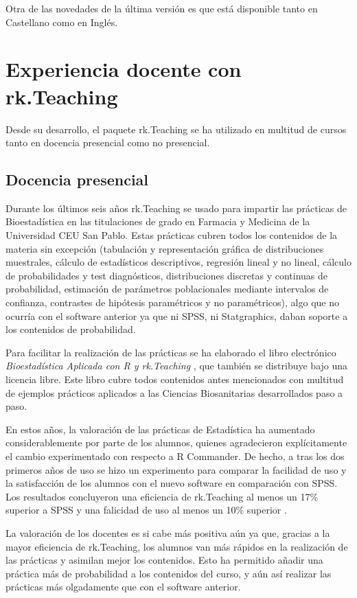\documentclass[a4paper,10pt,twoside]{article}
\newcommand{\rkteaching}{\textsf{rk.Teaching}}
\newcommand{\spss}{\textsf{SPSS}}
\newcommand{\statgraphics}{\textsf{Statgraphics}}
\begin{document}
Otra de las novedades de la última versión es que está disponible tanto en Castellano como en Inglés. 

\section{Experiencia docente con \rkteaching}
\label{s:docencia}
Desde su desarrollo, el paquete \rkteaching{} se ha utilizado en multitud de cursos tanto en docencia presencial como no
presencial. 

\subsection{Docencia presencial}
Durante los últimos seis años \rkteaching{} se usado para impartir las prácticas de Bioestadística en las titulaciones
de grado en Farmacia y Medicina de la Universidad CEU San Pablo.
Estas prácticas cubren todos los contenidos de la materia sin excepción (tabulación y representación gráfica de
distribuciones muestrales, cálculo de estadísticos descriptivos, regresión lineal y no lineal, cálculo de probabilidades
y test diagnósticos, distribuciones discretas y continuas de probabilidad, estimación de parámetros poblacionales
mediante intervalos de confianza, contrastes de hipótesis paramétricos y no paramétricos), algo que no ocurría con el
software anterior ya que ni \spss{}, ni \statgraphics{}, daban soporte a los contenidos de probabilidad.

Para facilitar la realización de las prácticas se ha elaborado el libro electrónico \emph{Bioestadística Aplicada
con R y rk.Teaching} \cite{sanchez2014bioestadistica}, que también se distribuye bajo una licencia libre. 
Este libro cubre todos contenidos antes mencionados con multitud de ejemplos prácticos aplicados a las Ciencias
Biosanitarias desarrollados paso a paso.

En estos años, la valoración de las prácticas de Estadística ha aumentado considerablemente por parte de los alumnos,
quienes agradecieron explícitamente el cambio experimentado con respecto a \textsf{R Commander}. 
De hecho, a tras los dos primeros años de uso se hizo un experimento para comparar la facilidad de uso y la satisfacción
de los alumnos con el nuevo software en comparación con \spss{}.
Los resultados concluyeron una eficiencia de \rkteaching{} al menos un 17\% superior a \spss{} y una falicidad de uso al
menos un 10\% superior \cite{sanchez2011rkteaching}.

La valoración de los docentes es si cabe más positiva aún ya que, gracias a la mayor eficiencia de \rkteaching{}, los
alumnos van más rápidos en la realización de las prácticas y asimilan mejor los contenidos. 
Esto ha permitido añadir una práctica más de probabilidad a los contenidos del curso, y aún así realizar las prácticas
más olgadamente que con el software anterior.
\end{document}
